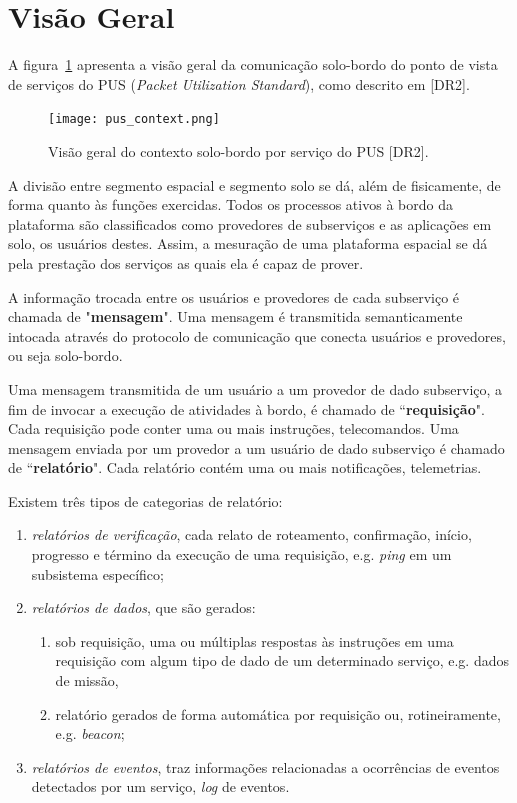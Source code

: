 \section{Visão Geral}

A figura~\ref{fig:pus_overview} apresenta a visão geral da comunicação solo-bordo do ponto de vista de serviços do PUS (\textit{Packet Utilization Standard}), como descrito em [DR2].

\begin{figure}[H]
    \centering
    \texttt{[image: pus\_context.png]}
    \caption{Visão geral do contexto solo-bordo por serviço do PUS [DR2].}
    \label{fig:pus_overview}
\end{figure}

A divisão entre segmento espacial e segmento solo se dá, além de fisicamente, de forma quanto às funções exercidas.
Todos os processos ativos à bordo da plataforma são classificados como provedores de subserviços e as aplicações em solo, os usuários destes.
Assim, a mesuração de uma plataforma espacial se dá pela prestação dos serviços as quais ela é capaz de prover.

A informação trocada entre os usuários e provedores de cada subserviço é chamada de "\textbf{mensagem}".
Uma mensagem é transmitida semanticamente intocada através do protocolo de comunicação que conecta usuários e provedores, ou seja solo-bordo.

Uma mensagem transmitida de um usuário a um provedor de dado subserviço, a fim de invocar a execução de atividades à bordo, é chamado de ``\textbf{requisição}".
Cada requisição pode conter uma ou mais instruções, telecomandos.
Uma mensagem enviada por um provedor a um usuário de dado subserviço é chamado de ``\textbf{relatório}".
Cada relatório contém uma ou mais notificações, telemetrias.

Existem três tipos de categorias de relatório:

\begin{enumerate}[label=\roman*.]
    \item \textit{relatórios de verificação}, cada relato de roteamento, confirmação, início, progresso e término da execução de uma requisição, e.g. \textit{ping} em um subsistema específico;
    \item \textit{relatórios de dados}, que são gerados:
    \begin{enumerate}[label=(\alph*)]
        \item sob requisição, uma ou múltiplas respostas às instruções em uma requisição com algum tipo de dado de um determinado serviço, e.g. dados de missão,
        \item relatório gerados de forma automática por requisição ou, rotineiramente, e.g. \textit{beacon};
    \end{enumerate}
    \item \textit{relatórios de eventos}, traz informações relacionadas a ocorrências de eventos detectados por um serviço, \textit{log} de eventos.
\end{enumerate}

